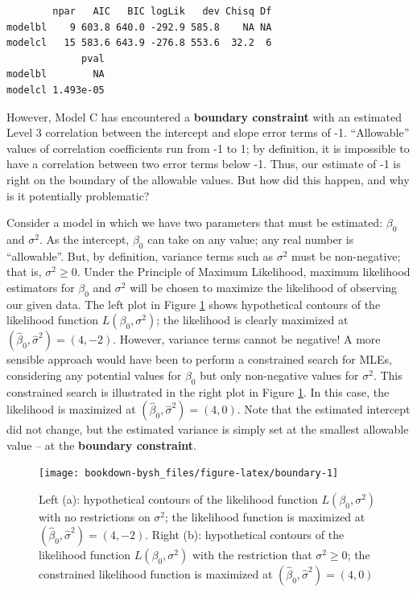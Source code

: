\documentclass[
]{krantz}
\begin{document}
\begin{verbatim}
        npar   AIC   BIC logLik   dev Chisq Df
modelbl    9 603.8 640.0 -292.9 585.8    NA NA
modelcl   15 583.6 643.9 -276.8 553.6  32.2  6
             pval
modelbl        NA
modelcl 1.493e-05
\end{verbatim}

However, Model C has encountered a \textbf{boundary constraint} with an estimated Level 3 correlation between the intercept and slope error terms of -1. ``Allowable'' values of correlation coefficients run from -1 to 1; by definition, it is impossible to have a correlation between two error terms below -1. Thus, our estimate of -1 is right on the boundary of the allowable values. But how did this happen, and why is it potentially problematic?

Consider a model in which we have two parameters that must be estimated: \(\beta_0\) and \(\sigma^2\). As the intercept, \(\beta_0\) can take on any value; any real number is ``allowable''. But, by definition, variance terms such as \(\sigma^2\) must be non-negative; that is, \(\sigma^2 \geq 0\). Under the Principle of Maximum Likelihood, maximum likelihood estimators for \(\beta_0\) and \(\sigma^2\) will be chosen to maximize the likelihood of observing our given data. The left plot in Figure \ref{fig:boundary} shows hypothetical contours of the likelihood function \(L(\beta_0, \sigma^2)\); the likelihood is clearly maximized at \((\hat{\beta}_0 , \hat{\sigma}^2)=(4,-2)\). However, variance terms cannot be negative! A more sensible approach would have been to perform a constrained search for MLEs, considering any potential values for \(\beta_0\) but only non-negative values for \(\sigma^2\). This constrained search is illustrated in the right plot in Figure \ref{fig:boundary}. In this case, the likelihood is maximized at \((\hat{\beta}_0 , \hat{\sigma}^2)=(4,0)\). Note that the estimated intercept did not change, but the estimated variance is simply set at the smallest allowable value -- at the \textbf{boundary constraint}.



\begin{figure}

{\centering \texttt{[image: bookdown-bysh\_files/figure-latex/boundary-1]} 

}

\caption{Left (a): hypothetical contours of the likelihood function \(L(\beta_0, \sigma^2)\) with no restrictions on \(\sigma^2\); the likelihood function is maximized at \((\hat{\beta}_0, \hat{\sigma}^2)=(4,-2)\). Right (b): hypothetical contours of the likelihood function \(L(\beta_0, \sigma^2)\) with the restriction that \(\sigma^2 \geq 0\); the constrained likelihood function is maximized at \((\hat{\beta}_0, \hat{\sigma}^2)=(4,0)\)}\label{fig:boundary}
\end{figure}
\end{document}
